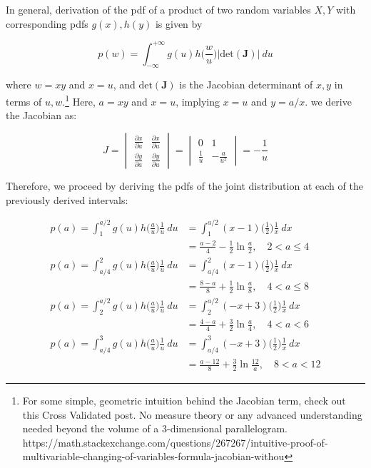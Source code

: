 \documentclass[10pt, oneside]{article}   	%
\theoremstyle{definition}
\begin{document}
\begin{enumerate}[label=6.\arabic*]
In general, derivation of the pdf of a product of two random variables $X, Y$ with corresponding pdfs $g(x), h(y)$ is given by

\[ p(w) = \int^{+\infty}_{-\infty} g(u) h \Big( \frac{w}{u} \Big) \Big| \text{det} (\bm{J}) \Big| \ du \]

where $w = xy$ and $x = u$, and $\text{det}(\bm{J})$ is the Jacobian determinant of $x, y$ in terms of $u, w$.\footnote{For some simple, geometric intuition behind the Jacobian term, check out this Cross Validated post. No measure theory or any advanced understanding needed beyond the volume of a 3-dimensional parallelogram. https://math.stackexchange.com/questions/267267/intuitive-proof-of-multivariable-changing-of-variables-formula-jacobian-withou} Here, $a = xy$ and $x = u$, implying $x = u$ and $y = a/x$. we derive the Jacobian as:

\begingroup
\renewcommand*{\arraystretch}{3.5}
\[ J = \begin{vmatrix}
\frac{\partial x}{\partial a} & \frac{\partial x}{\partial u} \\
\frac{\partial y}{\partial a} & \frac{\partial y}{\partial u}
\end{vmatrix} = \begin{vmatrix}
0 & 1 \\
\frac{1}{u} & -\frac{a}{u^2}
\end{vmatrix} = -\frac{1}{u}
 \]
 \endgroup

Therefore, we proceed by deriving the pdfs of the joint distribution at each of the previously derived intervals:

\begin{align*}
p(a) = \int^{a/2}_1 g(u) h \Big( \frac{a}{u} \Big) \frac{1}{u} \ du &= \int^{a/2}_1 (x-1) \Big( \frac{1}{2} \Big) \frac{1}{x} \ dx \\
&= \boxed{ \frac{a-2}{4} - \frac{1}{2} \ln \frac{a}{2}, \quad 2 < a \leq 4 } \\
p(a) = \int^2_{a/4} g(u) h \Big( \frac{a}{u} \Big) \frac{1}{u} \ du &= \int^2_{a/4} (x-1) \Big( \frac{1}{2} \Big) \frac{1}{x} \ dx \\
&= \boxed{ \frac{8-a}{8} + \frac{1}{2} \ln \frac{a}{8}, \quad 4 < a \leq 8 } \\
p(a) = \int^{a/2}_2 g(u) h \Big( \frac{a}{u} \Big) \frac{1}{u} \ du &=  \int^{a/2}_2 (-x + 3) \Big( \frac{1}{2} \Big) \frac{1}{x} \ dx \\
&= \boxed{ \frac{4-a}{4} + \frac{3}{2} \ln \frac{a}{4}, \quad 4 < a < 6 } \\
p(a) = \int^3_{a/4} g(u) h \Big( \frac{a}{u} \Big) \frac{1}{u} \ du &= \int^3_{a/4} (-x + 3) \Big( \frac{1}{2} \Big) \frac{1}{x} \ dx \\
&= \boxed{ \frac{a-12}{8} + \frac{3}{2} \ln \frac{12}{a}, \quad 8 < a < 12 }
\end{align*}


\end{enumerate}
\end{document}
